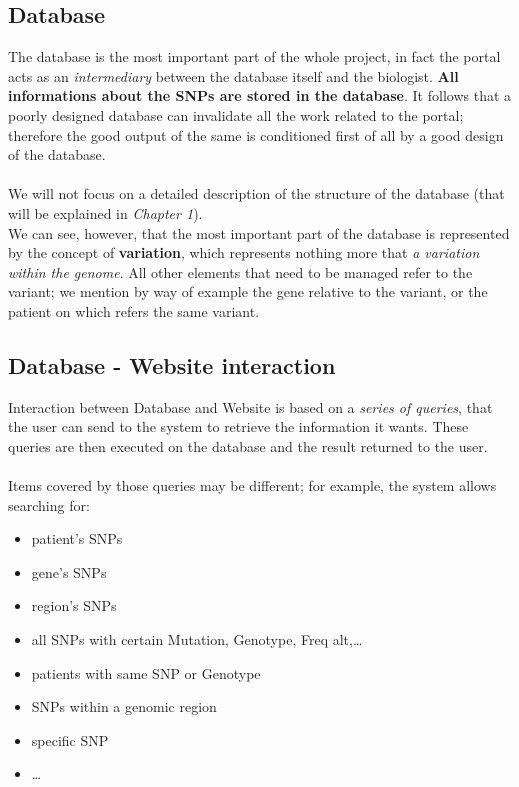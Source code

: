 \subsection{Database}
The database is the most important part of the whole project, in fact the portal acts as an \emph{intermediary} between the database itself and the biologist. \textbf{All informations about the SNPs are stored in the database}. It follows that a poorly designed database can invalidate all the work related to the portal; therefore the good output of the same is conditioned first of all by a good design of the database.
\\
\\We will not focus on a detailed description of the structure of the database (that will be explained in \emph{Chapter 1}).
\\We can see, however, that the most important part of the database is represented by the concept of \textbf{variation}, which represents nothing more that \emph{a variation within the genome}. All other elements that need to be managed refer to the variant; we mention by way of example the gene relative to the variant, or the patient on which refers the same variant.
  
\subsection{Database - Website interaction}
Interaction between Database and Website is based on a \emph{series of queries}, that the user can send to the system to retrieve the information it wants. These queries are then executed on the database and the result returned to the user. 
\\
\\Items covered by those queries may be different; for example, the system allows searching for:
\begin{itemize}
 \item patient’s SNPs
 \item gene’s SNPs
 \item region’s SNPs
 \item all SNPs with certain Mutation, Genotype, Freq alt,\ldots
 \item patients with same SNP or Genotype
 \item SNPs within a genomic region
 \item specific SNP
 \item \ldots
\end{itemize}

